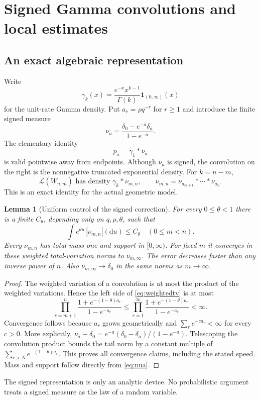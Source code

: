 \documentclass[11pt,a4paper]{article}
\numberwithin{equation}{section}
\newtheorem{lemma}[theorem]{Lemma}
\theoremstyle{definition}
\theoremstyle{remark}
\newcommand{\Law}{\mathcal L}
\newcommand{\ind}{\mathbf 1}
\newcommand{\dd}{\mathrm d}
\begin{document}
\section{Signed Gamma convolutions and local estimates}
\label{sec:gamma}

\subsection{An exact algebraic representation}
Write
\[
\gamma_k(x)=\frac{e^{-x}x^{k-1}}{\Gamma(k)}\ind_{(0,\infty)}(x)
\]
for the unit-rate Gamma density. Put $a_r=\rho q^{-r}$ for $r\ge1$ and
introduce the finite signed measure
\begin{equation}\label{eq:nua}
\nu_a=\frac{\delta_0-e^{-a}\delta_a}{1-e^{-a}}.
\end{equation}
The elementary identity
\begin{equation}\label{eq:singleconv}
p_a=\gamma_1*\nu_a
\end{equation}
is valid pointwise away from endpoints. Although $\nu_a$ is signed,
the convolution on the right is the nonnegative truncated exponential
density. For $k=n-m$,
\begin{equation}\label{eq:prefixgamma}
\Law(W_{n,m})\text{ has density }
 \gamma_k*\nu_{m,n},\qquad
 \nu_{m,n}=\nu_{a_{m+1}}*\cdots*\nu_{a_n}.
\end{equation}
This is an exact identity for the actual geometric model.

\begin{lemma}[Uniform control of the signed correction]\label{lem:signed}
For every $0\le\theta<1$ there is a finite $C_\theta$, depending only on
$q,\rho,\theta$, such that
\begin{equation}\label{eq:weightedtv}
\int e^{\theta u}\,|\nu_{m,n}|(\dd u)\le C_\theta
       \quad(0\le m<n).
\end{equation}
Every $\nu_{m,n}$ has total mass one and support in $[0,\infty)$.
For fixed $m$ it converges in these weighted total-variation norms to
$\nu_{m,\infty}$. The error decreases faster than any inverse power
of $n$. Also $\nu_{m,\infty}\to\delta_0$ in the same norms as $m\to\infty$.
\end{lemma}
\begin{proof}
The weighted variation of a convolution is at most the product of the
weighted variations. Hence the left side of \eqref{eq:weightedtv} is at
most
\[
\prod_{r=m+1}^n
\frac{1+e^{-(1-\theta)a_r}}{1-e^{-a_r}}
\le\prod_{r=1}^{\infty}
\frac{1+e^{-(1-\theta)a_r}}{1-e^{-a_r}}<\infty.
\]
Convergence follows because $a_r$ grows geometrically and
$\sum_r e^{-c a_r}<\infty$ for every $c>0$. More explicitly,
$\nu_a-\delta_0=e^{-a}(\delta_0-\delta_a)/(1-e^{-a})$.
Telescoping the convolution product bounds the tail norm by a constant
multiple of $\sum_{r>N}e^{-(1-\theta)a_r}$. This proves all convergence
claims, including the stated speed. Mass and support follow directly
from \eqref{eq:nua}.
\end{proof}
The signed representation is only an analytic device. No probabilistic
argument treats a signed measure as the law of a random variable.
\end{document}
